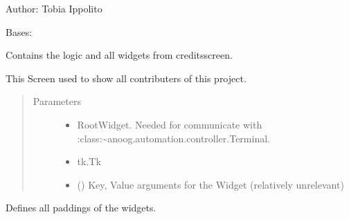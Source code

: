 \documentclass[letterpaper,10pt,english]{sphinxmanual}
\begin{document}
\sphinxAtStartPar
Author: Tobia Ippolito

\begin{fulllineitems}
\label{\detokenize{anoog.automation:anoog.automation.graphical_user_interface.Credits_Window}}
\sphinxAtStartPar
Bases: {\hyperref[\detokenize{anoog.automation:anoog.automation.graphical_user_interface.Screen}]{}}

\sphinxAtStartPar
Contains the logic and all widgets from credits\sphinxhyphen{}screen.

\sphinxAtStartPar
This Screen used to show all contributers of this project.
\begin{quote}\begin{description}
\item[{Parameters}] \leavevmode\begin{itemize}
\item {} 
\sphinxAtStartPar
{} \textendash{} Root\sphinxhyphen{}Widget. Needed for communicate with :class:\textasciitilde{}anoog.automation.controller.Terminal.

\item {} 
\sphinxAtStartPar
{} \textendash{} tk.Tk

\item {} 
\sphinxAtStartPar
{} () \textendash{} Key, Value arguments for the Widget (relatively unrelevant)

\end{itemize}

\end{description}\end{quote}

\begin{fulllineitems}
\label{\detokenize{anoog.automation:anoog.automation.graphical_user_interface.Credits_Window.add_padding}}
\sphinxAtStartPar
Defines all paddings of the widgets.


\end{fulllineitems}
\end{fulllineitems}
\end{document}
